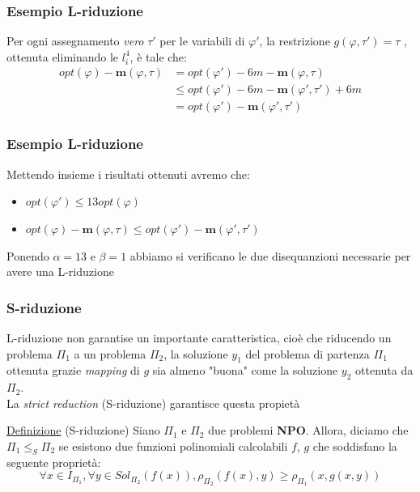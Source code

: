 \documentclass{beamer}
\begin{document}
\begin{frame}
    \frametitle{Esempio L-riduzione}
    Per ogni assegnamento \textit{vero} $\tau'$ per le variabili di $\varphi'$, la restrizione $g(\varphi, \tau') = \tau$ , ottenuta eliminando le $l_i^4$, è tale che:
    \begin{equation}
        \begin{split}
            opt(\varphi)-\textbf{m}(\varphi, \tau) & = opt(\varphi')-6m-\textbf{m}(\varphi, \tau) \\
            & \leq opt(\varphi')-6m -\textbf{m}(\varphi', \tau')+6m\\
            &= opt(\varphi')-\textbf{m}(\varphi', \tau')
        \end{split}
    \end{equation}
\end{frame}

\begin{frame}
    \frametitle{Esempio L-riduzione}
    Mettendo insieme i risultati ottenuti avremo che:
        \begin{itemize}
     \item $ opt(\varphi') \leq  13opt(\varphi) $
     \item $ opt(\varphi)-\textbf{m}(\varphi, \tau) \leq opt(\varphi')-\textbf{m}(\varphi', \tau') $ 
    \end{itemize}
    Ponendo $\alpha = 13$ e $\beta = 1$ abbiamo si verificano le due disequanzioni necessarie per avere una L-riduzione
\end{frame}


\begin{frame}
    \frametitle{S-riduzione}
    L-riduzione non garantise un importante caratteristica, cioè che riducendo un problema $\Pi_1$ a un problema $\Pi_2$, la soluzione $y_1$ del problema di partenza $\Pi_1$ ottenuta grazie \textit{mapping} di $g$ sia almeno "buona" come la soluzione $y_2$ ottenuta da $\Pi_2$.\\
    La \textit{strict reduction} (S-riduzione) garantisce questa propietà
    \begin{block}{\underline{Definizione} (S-riduzione)}
     Siano $\Pi_1$ e $\Pi_2$ due problemi \textbf{NPO}. Allora, diciamo che $\Pi_1 \leq_S \Pi_2$ se esistono due funzioni polinomiali calcolabili $f$, $g$ che soddisfano la seguente proprietà:
     $$\forall x\in I_{\Pi_1}, \forall y \in Sol_{\Pi_2}(f(x)), \rho_ {\Pi_2}(f(x), y) \geq \rho_{\Pi_1}(x, g(x, y)) $$
    \end{block}


\end{frame}
\end{document}
